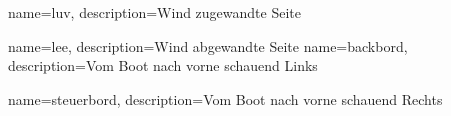 



{
    name=luv,
    description={Wind zugewandte Seite}
}

{
    name=lee,
    description={Wind abgewandte Seite}
}
{
    name=backbord,
    description={Vom Boot nach vorne schauend Links}
}

{
    name=steuerbord,
    description={Vom Boot nach vorne schauend Rechts}
}